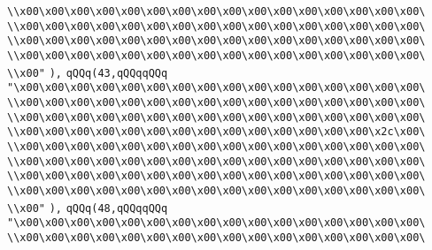 \verb|\\x00\x00\x00\x00\x00\x00\x00\x00\x00\x00\x00\x00\x00\x00\x00\x00\|\newline
\verb|\\x00\x00\x00\x00\x00\x00\x00\x00\x00\x00\x00\x00\x00\x00\x00\x00\|\newline
\verb|\\x00\x00\x00\x00\x00\x00\x00\x00\x00\x00\x00\x00\x00\x00\x00\x00\|\newline
\verb|\\x00\x00\x00\x00\x00\x00\x00\x00\x00\x00\x00\x00\x00\x00\x00\x00\|\newline
\verb|\\x00"|\newline
\verb|),|\newline
\verb|qQQq(43,qQQqqQQq|\newline
\verb|"\x00\x00\x00\x00\x00\x00\x00\x00\x00\x00\x00\x00\x00\x00\x00\x00\|\newline
\verb|\\x00\x00\x00\x00\x00\x00\x00\x00\x00\x00\x00\x00\x00\x00\x00\x00\|\newline
\verb|\\x00\x00\x00\x00\x00\x00\x00\x00\x00\x00\x00\x00\x00\x00\x00\x00\|\newline
\verb|\\x00\x00\x00\x00\x00\x00\x00\x00\x00\x00\x00\x00\x00\x00\x2c\x00\|\newline
\verb|\\x00\x00\x00\x00\x00\x00\x00\x00\x00\x00\x00\x00\x00\x00\x00\x00\|\newline
\verb|\\x00\x00\x00\x00\x00\x00\x00\x00\x00\x00\x00\x00\x00\x00\x00\x00\|\newline
\verb|\\x00\x00\x00\x00\x00\x00\x00\x00\x00\x00\x00\x00\x00\x00\x00\x00\|\newline
\verb|\\x00\x00\x00\x00\x00\x00\x00\x00\x00\x00\x00\x00\x00\x00\x00\x00\|\newline
\verb|\\x00"|\newline
\verb|),|\newline
\verb|qQQq(48,qQQqqQQq|\newline
\verb|"\x00\x00\x00\x00\x00\x00\x00\x00\x00\x00\x00\x00\x00\x00\x00\x00\|\newline
\verb|\\x00\x00\x00\x00\x00\x00\x00\x00\x00\x00\x00\x00\x00\x00\x00\x00\|\newline
